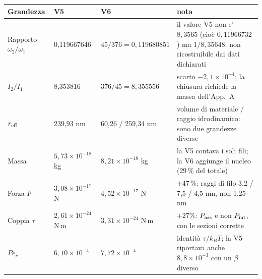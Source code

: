 \begin{tabular}{p{2.9cm}p{3.0cm}p{3.0cm}p{5.5cm}}
\hline
Grandezza & V5 & V6 & nota \\
\hline
Rapporto $\omega_2/\omega_1$ & 0{,}119667646 & $45/376=0{,}119680851$ & il valore V5 non e' $8{,}3565$ (cio\`e $0{,}11966732$) ma $1/8{,}35648$: non ricostruibile dai dati dichiarati \\
$I_2/I_1$ & 8{,}353816 & $376/45=8{,}355556$ & scarto $-2{,}1\times10^{-4}$; la chiusura richiede la massa dell'App.~A \\
$r_{\rm eff}$ & 239{,}93 nm & 60{,}26 / 259{,}34 nm & volume di materiale / raggio idrodinamico: sono due grandezze diverse \\
Massa & $5{,}73\times10^{-18}$ kg & $8{,}21\times10^{-18}$ kg & la V5 contava i soli fili; la V6 aggiunge il nucleo (29\,\% del totale) \\
Forza $F$ & $3{,}08\times10^{-17}$ N & $4{,}52\times10^{-17}$ N & $+47$\,\%: raggi di filo 3,2 / 7,5 / 4,5 nm, non 1,25 nm \\
Coppia $\tau$ & $2{,}61\times10^{-24}$ N\,m & $3{,}31\times10^{-24}$ N\,m & $+27\%$: $P_{\rm ass}$ e non $P_{\rm int}$, con le sezioni corrette \\
$Pe_r$ & $6{,}10\times10^{-4}$ & $7{,}72\times10^{-4}$ & identit\`a $\tau/k_BT$; la V5 riportava anche $8{,}8\times10^{-3}$ con un $\beta$ diverso \\
\hline
\end{tabular}
